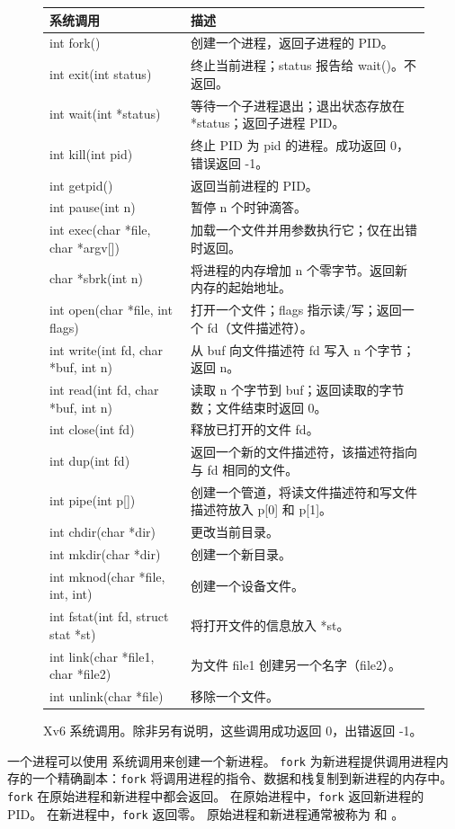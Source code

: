 \begin{figure}[t]
\center
\begin{tabular}{ll}
{\bf 系统调用} & {\bf 描述} \\
\midrule
int fork() & 创建一个进程，返回子进程的 PID。 \\
int exit(int status) & 终止当前进程；status 报告给 wait()。不返回。 \\
int wait(int *status) & 等待一个子进程退出；退出状态存放在 *status；返回子进程 PID。 \\
int kill(int pid) & 终止 PID 为 pid 的进程。成功返回 0，错误返回 -1。 \\
int getpid() & 返回当前进程的 PID。 \\
int pause(int n) & 暂停 n 个时钟滴答。 \\
int exec(char *file, char *argv[]) & 加载一个文件并用参数执行它；仅在出错时返回。 \\
char *sbrk(int n) & 将进程的内存增加 n 个零字节。返回新内存的起始地址。 \\
int open(char *file, int flags) & 打开一个文件；flags 指示读/写；返回一个 fd（文件描述符）。 \\
int write(int fd, char *buf, int n) & 从 buf 向文件描述符 fd 写入 n 个字节；返回 n。 \\
int read(int fd, char *buf, int n) & 读取 n 个字节到 buf；返回读取的字节数；文件结束时返回 0。 \\
int close(int fd) & 释放已打开的文件 fd。 \\
int dup(int fd) & 返回一个新的文件描述符，该描述符指向与 fd 相同的文件。\\
int pipe(int p[]) & 创建一个管道，将读文件描述符和写文件描述符放入 p[0] 和 p[1]。 \\
int chdir(char *dir) & 更改当前目录。 \\
int mkdir(char *dir) & 创建一个新目录。 \\
int mknod(char *file, int, int) & 创建一个设备文件。 \\
int fstat(int fd, struct stat *st) & 将打开文件的信息放入 *st。 \\
int link(char *file1, char *file2) & 为文件 file1 创建另一个名字（file2）。 \\
int unlink(char *file) & 移除一个文件。 \\
\end{tabular}
\caption{Xv6 系统调用。除非另有说明，这些调用成功返回 0，出错返回 -1。}
\label{fig:api}
\end{figure}

一个进程可以使用
系统调用来创建一个新进程。
\lstinline{fork}
为新进程提供调用进程内存的一个精确副本：\lstinline{fork} 将调用进程的指令、数据和栈复制到新进程的内存中。
\lstinline{fork}
在原始进程和新进程中都会返回。
在原始进程中，\lstinline{fork} 返回新进程的 PID。
在新进程中，\lstinline{fork} 返回零。
原始进程和新进程通常被称为
和
。

